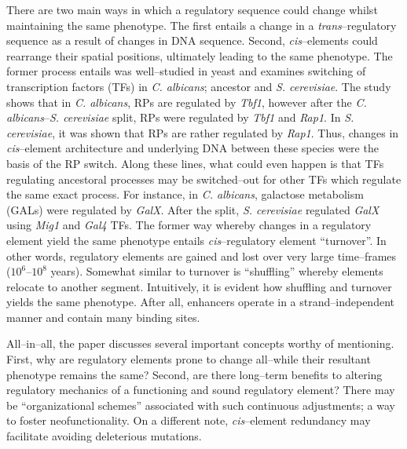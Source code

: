 \documentclass{article}
\begin{document}
	 There are two main ways in which a regulatory sequence could change whilst maintaining the same phenotype.
	 The first entails a change in a \textit{trans}--regulatory sequence as a result of changes in DNA sequence. 
	 Second, \textit{cis}--elements could rearrange their spatial positions, ultimately leading to
	 the same phenotype. The former process entails was well--studied in yeast and examines switching of transcription factors (TFs)
	 in \textit{C. albicans}; ancestor and \textit{S. cerevisiae}. The study shows that in \textit{C. albicans}, RPs are regulated by
	 \textit{Tbf1}, however after the \textit{C. albicans}--\textit{S. cerevisiae} split, RPs were regulated by \textit{Tbf1} and \textit{Rap1}.
	 In \textit{S. cerevisiae}, it was shown that RPs are rather regulated by \textit{Rap1}. Thus, changes in \textit{cis}--element architecture
	 and underlying DNA between these species were the basis of the RP switch. Along these lines, what could even happen is that TFs regulating ancestoral
	 processes may be switched--out for other TFs which regulate the same exact process. For instance, in \textit{C. albicans}, galactose metabolism (GALs) 
	 were regulated by \textit{GalX}. After the split, \textit{S. cerevisiae} regulated \textit{GalX} using \textit{Mig1} and \textit{Gal4} TFs.
	 The former way whereby changes in a regulatory element yield the same phenotype entails \textit{cis}--regulatory element ``turnover''.
	 In other words, regulatory elements are gained and lost over very large time--frames ($10^6$--$10^8$ years).
	 Somewhat similar to turnover is ``shuffling'' whereby elements relocate to another segment. Intuitively, it is evident
	 how shuffling and turnover yields the same phenotype. After all, enhancers operate in a strand--independent manner and contain
	 many binding sites. 
	 
	 All--in--all, the paper discusses several important concepts worthy of mentioning. First, why are regulatory elements prone to change 
	 all--while their resultant phenotype remains the same? Second, are there long--term benefits to altering regulatory mechanics of a functioning
	 and sound regulatory element? There may be ``organizational schemes'' associated with such continuous  adjustments; a way to foster neofunctionality.
	 On a different note, \textit{cis}--element redundancy may facilitate avoiding deleterious mutations.



\end{document}
